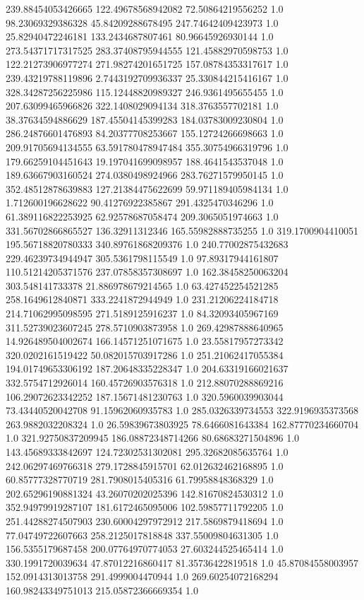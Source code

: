 239.88454053426665	122.49678568942082	72.50864219556252	1.0
98.23069329386328	45.84209288678495	247.74642409423973	1.0
25.82940472246181	133.2434687807461	80.96645926930144	1.0
273.54371717317525	283.37408795944555	121.45882970598753	1.0
122.21273906977274	271.98274201651725	157.08784353317617	1.0
239.43219788119896	2.7443192709936337	25.330844215416167	1.0
328.34287256225986	115.12448820989327	246.9361495655455	1.0
207.63099465966826	322.1408029094134	318.3763557702181	1.0
38.37634594886629	187.45504145399283	184.03783009230804	1.0
286.24876601476893	84.20377708253667	155.12724266698663	1.0
209.91705694134555	63.591780478947484	355.30754966319796	1.0
179.66259104451643	19.197041699098957	188.4641543537048	1.0
189.63667903160524	274.0380498924966	283.76271579950145	1.0
352.48512878639883	127.21384475622699	59.971189405984134	1.0
1.712600196628622	90.41276922385867	291.4325470346296	1.0
61.389116822253925	62.92578687058474	209.3065051974663	1.0
331.56702866865527	136.32911312346	165.55982888735255	1.0
319.1700904410051	195.56718820780333	340.89761868209376	1.0
240.77002875432683	229.46239734944947	305.5361798115549	1.0
97.89317944161807	110.51214205371576	237.07858357308697	1.0
162.38458250063204	303.548141733378	21.886978679214565	1.0
63.427452254521285	258.1649612840871	333.2241872944949	1.0
231.21206224184718	214.71062995098595	271.5189125916237	1.0
84.32093405967169	311.52739023607245	278.5710903873958	1.0
269.42987888640965	14.926489504002674	166.14571251071675	1.0
23.55817957273342	320.0202161519422	50.082015703917286	1.0
251.21062417055384	194.01749653306192	187.20648335228347	1.0
204.63319166021637	332.5754712926014	160.45726903576318	1.0
212.88070288869216	106.29072623342252	187.15671481230763	1.0
320.5960039903044	73.43440520042708	91.15962060935783	1.0
285.0326339734553	322.9196935373568	263.9882032208324	1.0
26.59839673803925	78.6466081643384	162.87770234660704	1.0
321.92750837209945	186.08872348714266	80.68683271504896	1.0
143.45689333842697	124.72302531302081	295.32682085635764	1.0
242.06297469766318	279.1728845915701	62.012632462168895	1.0
60.85777328770719	281.7908015405316	61.79958848368329	1.0
202.65296190881324	43.26070202025396	142.81670824530312	1.0
352.94979919287107	181.6172465095006	102.59857711792205	1.0
251.44288274507903	230.60004297972912	217.5869879418694	1.0
77.04749722607663	258.2125017818848	337.55009804631305	1.0
156.5355179687458	200.07764970774053	27.603244525465414	1.0
330.1991720039634	47.87012216860417	81.35736422819518	1.0
45.87084558003957	152.0914313013758	291.4999004470944	1.0
269.60254072168294	160.98243349751013	215.05872366669354	1.0

